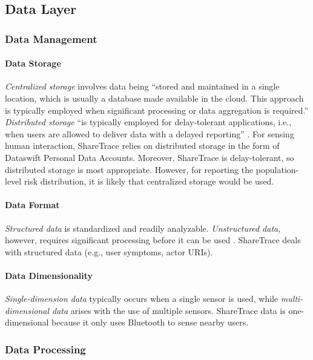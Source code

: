 \subsection{Data Layer}

\subsubsection{Data Management}

\paragraph{Data Storage}

\emph{Centralized storage} involves data being ``stored and maintained in a single location, which is usually a database made available in the cloud. This approach is typically employed when significant processing or data aggregation is required.'' \emph{Distributed storage} ``is typically employed for delay-tolerant applications, i.e., when users are allowed to deliver data with a delayed reporting'' \cite{Capponi2019}. For sensing human interaction, ShareTrace relies on distributed storage in the form of Dataswift Personal Data Accounts. Moreover, ShareTrace is delay-tolerant, so distributed storage is most appropriate. However, for reporting the population-level risk distribution, it is likely that centralized storage would be used.

\paragraph{Data Format}

\emph{Structured data} is standardized and readily analyzable. \emph{Unstructured data}, however, requires significant processing before it can be used \cite{Capponi2019}. ShareTrace deals with structured data (e.g., user symptoms, actor URIs).

\paragraph{Data Dimensionality}

\emph{Single-dimension data} typically occurs when a single sensor is used, while \emph{multi-dimensional data} arises with the use of multiple sensors. ShareTrace data is one-dimensional because it only uses Bluetooth to sense nearby users.

\subsubsection{Data Processing}

